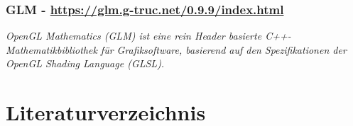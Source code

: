 \subsubsection*{GLM - \url{https://glm.g-truc.net/0.9.9/index.html}}
\textit{OpenGL Mathematics (GLM) ist eine rein Header basierte C++-Mathematikbibliothek für Grafiksoftware, basierend auf den Spezifikationen der OpenGL Shading Language (GLSL).}
\newpage
\section{Literaturverzeichnis}
\printbibliography[heading=none]